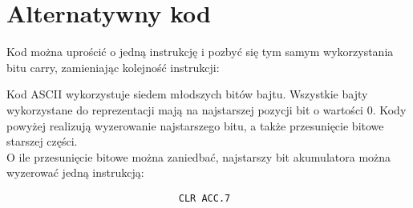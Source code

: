 \documentclass[a4paper,12pt]{extarticle}  %
\begin{document}
\section{Alternatywny kod}
Kod można uprościć o jedną instrukcję i pozbyć się tym samym wykorzystania bitu carry, zamieniając kolejność instrukcji:

\begin{table}[H]
	\centering
\end{table}
Kod ASCII wykorzystuje siedem młodszych bitów bajtu.
Wszystkie bajty wykorzystane do reprezentacji mają na najstarszej pozycji bit o wartości 0.
Kody powyżej realizują wyzerowanie najstarszego bitu, a także przesunięcie bitowe starszej części.\\
O ile przesunięcie bitowe można zaniedbać, najstarszy bit akumulatora można wyzerować jedną instrukcją:
\begin{lstlisting}
                              CLR ACC.7
\end{lstlisting}
\end{document}
